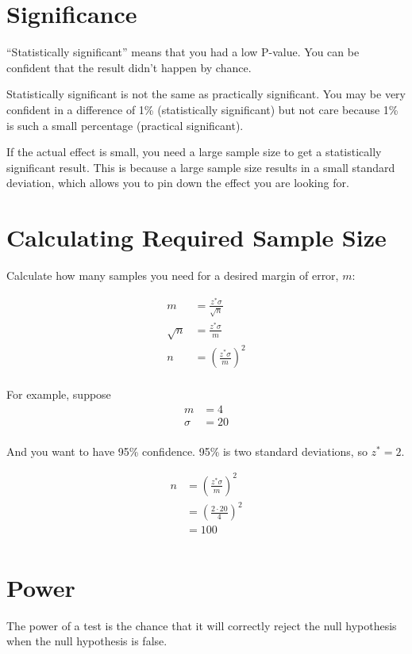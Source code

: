 \documentclass[landscape]{exam}
\begin{document}
  \section{Significance}
  ``Statistically significant'' means that you had a low P-value. You can be
  confident that the result didn't happen by chance.

  Statistically significant is not the same as practically significant. You may be
  very confident in a difference of 1\% (statistically significant) but not care
  because 1\% is such a small percentage (practical significant).

  If the actual effect is small, you need a large sample size to get a
  statistically significant result. This is because a large sample size results
  in a small standard deviation, which allows you to pin down the effect you are
  looking for.

  \section{Calculating Required Sample Size}

  Calculate how many samples you need for a desired margin of error, $m$:

  \begin{align*}
    m        & = \frac{z^* \sigma}{\sqrt{n}} \\
    \sqrt{n} & = \frac{z^* \sigma}{m} \\
    n        & = \left( \frac{z^* \sigma}{m} \right)^2 \\
  \end{align*}

  For example, suppose 
  \begin{align*}
    m      & = 4 \\
    \sigma & = 20 \\
  \end{align*}
  
  And you want to have 95\% confidence.  95\% is two standard deviations, so
  $z^* = 2$. 

  \begin{align*}
    n & = \left( \frac{z^* \sigma}{m} \right)^2 \\
      & = \left( \frac{2 \cdot 20}{4} \right)^2 \\
      & = 100 \\
  \end{align*}

  \section{Power}
  The power of a test is the chance that it will correctly reject the null
  hypothesis when the null hypothesis is false.
\end{document}
